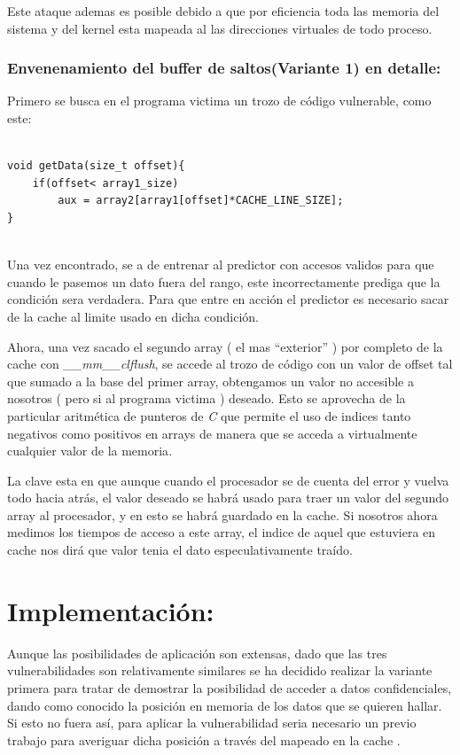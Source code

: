 \documentclass[paper=a4, fontsize=11pt]{scrartcl} %
\begin{document}
Este ataque ademas es posible debido a que por eficiencia toda las memoria del sistema y del kernel esta mapeada al las direcciones virtuales de todo proceso.


\subsubsection{Envenenamiento del buffer de saltos(Variante 1) en detalle:}

Primero se busca en el programa victima un trozo de código vulnerable, como este:

\begin{lstlisting}[frame=single, style=myCustomStyle ]

void getData(size_t offset){
    if(offset< array1_size)
        aux = array2[array1[offset]*CACHE_LINE_SIZE];
}


\end{lstlisting}


Una vez encontrado, se a de entrenar al predictor con accesos validos para que cuando le pasemos un dato fuera del rango, este incorrectamente prediga que la condición sera verdadera. 
Para que entre en acción el predictor es necesario sacar de la cache al limite usado en dicha condición.

Ahora, una vez sacado el segundo array ( el mas “exterior” ) por completo de la cache con \textit{\_\_mm\_\_clflush}, se accede al trozo de código con un valor de offset tal que sumado a la base del primer array, obtengamos un valor no accesible a nosotros ( pero si al programa victima ) deseado. Esto se aprovecha de la particular aritmética de punteros de \textit{C} que permite el uso de indices tanto negativos como positivos en arrays de manera que se acceda a virtualmente cualquier valor de la memoria\cite{cstandar}.


La clave esta en que aunque cuando el procesador se de cuenta del error  y vuelva todo hacia atrás, el valor deseado se habrá usado para traer un valor del segundo array al procesador, y en esto se habrá guardado en la cache. Si nosotros ahora medimos los tiempos de acceso a este array, el indice de aquel que estuviera en cache nos dirá que valor tenia el dato especulativamente traído.



\section{Implementación:}

Aunque las posibilidades de aplicación son extensas, dado que las tres vulnerabilidades son relativamente similares se ha decidido realizar la variante primera para tratar de demostrar la posibilidad de acceder a datos confidenciales, dando como conocido la posición en memoria de los datos que se quieren hallar. Si esto no fuera así, para aplicar la vulnerabilidad seria necesario un previo trabajo para averiguar dicha posición a través del mapeado en la cache \cite{yarom}. 
\end{document}
